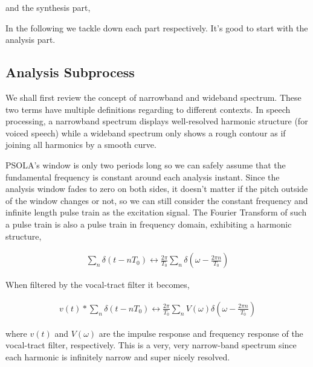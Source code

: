\documentclass{article}
\begin{document}
and the synthesis part,

\begin{center}
\end{center}

In the following we tackle down each part respectively. It's good to start with the analysis part.

\subsection{Analysis Subprocess}

We shall first review the concept of narrowband and wideband spectrum. These two terms have multiple definitions regarding to different contexts. In speech processing, a narrowband spectrum displays well-resolved harmonic structure (for voiced speech) while a wideband spectrum only shows a rough contour as if joining all harmonics by a smooth curve.

PSOLA's window is only two periods long so we can safely assume that the fundamental frequency is constant around each analysis instant. Since the analysis window fades to zero on both sides, it doesn't matter if the pitch outside of the window changes or not, so we can still consider the constant frequency and infinite length pulse train as the excitation signal. The Fourier Transform of such a pulse train is also a pulse train in frequency domain, exhibiting a harmonic structure,

\begin{align}
\sum_n \delta(t - nT_0) \leftrightarrow \frac{2\pi}{T_0} \sum_n \delta(\omega - \frac{2\pi n}{T_0})
\end{align}

When filtered by the vocal-tract filter it becomes,

\begin{align}
v(t) \ast \sum_n \delta(t - nT_0) \leftrightarrow \frac{2\pi}{T_0} \sum_n V(\omega) \delta(\omega - \frac{2\pi n}{T_0})
\end{align}

where $v(t)$ and $V(\omega)$ are the impulse response and frequency response of the vocal-tract filter, respectively. This is a very, very narrow-band spectrum since each harmonic is infinitely narrow and super nicely resolved.
\end{document}
